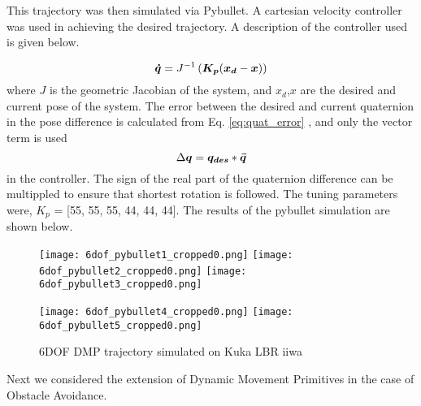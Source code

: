 

This trajectory was then simulated via Pybullet. A cartesian velocity controller was used in achieving the desired trajectory.
A description of the controller used is given below.

\begin{equation}
    \boldsymbol{\dot{q}} = J^{-1} \left( \boldsymbol{K_p} (\boldsymbol{x_d} - \boldsymbol{x}) \right)
\end{equation}
where $J$ is the geometric Jacobian of the system, and $x_d$,$x$ are the desired and current pose of the system. The error 
between the desired and current quaternion in the pose difference is calculated from Eq. \ref{eq:quat_error} , and only the vector term is used
\begin{equation}\label{eq:quat_error}
    \Delta \boldsymbol{q} = \boldsymbol{q_{des}} * \boldsymbol{\bar{q}}
\end{equation}
in the controller. The sign of the real part of the quaternion difference can be multippled to ensure that shortest rotation is followed.
The tuning parameters were, $K_p$ = [55, 55, 55, 44, 44, 44].
The results of the pybullet simulation are shown below.

\begin{figure}[h]
    \centering
    \texttt{[image: 6dof\_pybullet1\_cropped0.png]}\quad
    \texttt{[image: 6dof\_pybullet2\_cropped0.png]}\quad
    \texttt{[image: 6dof\_pybullet3\_cropped0.png]}

    \medskip

    \texttt{[image: 6dof\_pybullet4\_cropped0.png]}\quad
    \texttt{[image: 6dof\_pybullet5\_cropped0.png]}

    \caption{6DOF DMP trajectory simulated on Kuka LBR iiwa }
    \label{fig:6DOF_traj_pybullet}
\end{figure}

Next we considered the extension of Dynamic Movement Primitives in the case of Obstacle Avoidance.






















